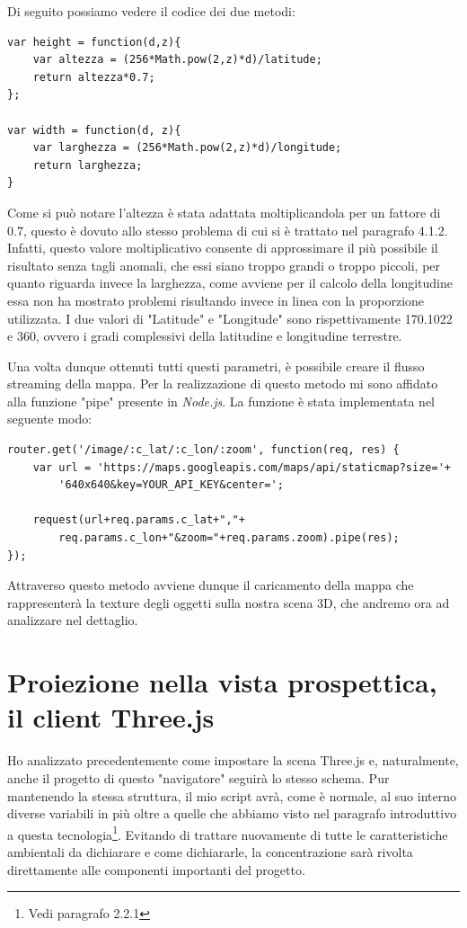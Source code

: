 Di seguito possiamo vedere il codice dei due metodi:
\begin{verbatim}
var height = function(d,z){
    var altezza = (256*Math.pow(2,z)*d)/latitude;
    return altezza*0.7;
};

var width = function(d, z){
    var larghezza = (256*Math.pow(2,z)*d)/longitude;
    return larghezza;
}
\end{verbatim}
Come si può notare l'altezza è stata adattata moltiplicandola per un fattore di 0.7, questo è dovuto allo stesso problema di cui si è trattato nel paragrafo 4.1.2. Infatti, questo valore moltiplicativo consente di approssimare il più possibile il risultato senza tagli anomali, che essi siano troppo grandi o troppo piccoli, per quanto riguarda invece la larghezza, come avviene per il calcolo della longitudine essa non ha mostrato problemi risultando invece in linea con la proporzione utilizzata. I due valori di "Latitude" e "Longitude" sono rispettivamente 170.1022 e 360, ovvero i gradi complessivi della latitudine e longitudine terrestre.

Una volta dunque ottenuti tutti questi parametri, è possibile creare il flusso streaming della mappa. Per la realizzazione di questo metodo mi sono affidato alla funzione "pipe" presente in \textit{Node.js}. La funzione è stata implementata nel seguente modo: 
\begin{verbatim}
router.get('/image/:c_lat/:c_lon/:zoom', function(req, res) {
    var url = 'https://maps.googleapis.com/maps/api/staticmap?size='+
    	'640x640&key=YOUR_API_KEY&center=';

    request(url+req.params.c_lat+","+
    	req.params.c_lon+"&zoom="+req.params.zoom).pipe(res);
});
\end{verbatim}
Attraverso questo metodo avviene dunque il caricamento della mappa che rappresenterà la texture degli oggetti sulla nostra scena 3D, che andremo ora ad analizzare nel dettaglio.

\section{Proiezione nella vista prospettica, il client Three.js}
Ho analizzato precedentemente come impostare la scena Three.js e, naturalmente, anche il progetto di questo "navigatore" seguirà lo stesso schema. Pur mantenendo la stessa struttura, il mio script avrà, come è normale, al suo interno diverse variabili in più oltre a quelle che abbiamo visto nel paragrafo introduttivo a questa tecnologia\footnote{Vedi paragrafo 2.2.1}. Evitando di trattare nuovamente di tutte le caratteristiche ambientali da dichiarare e come dichiararle, la concentrazione sarà rivolta direttamente alle componenti importanti del progetto.

